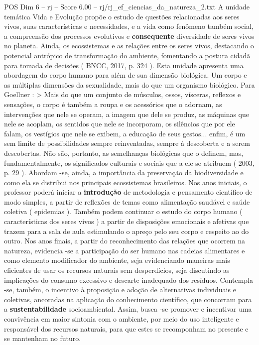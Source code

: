 \begin{textsample}{POS Dim 6 – rj – Score 6.00 – rj/rj\_ef\_ciencias\_da\_natureza\_2.txt}
A unidade temática Vida e Evolução propõe o estudo de questões relacionadas aos seres vivos, suas características e necessidades, e a vida como fenômeno também social, a compreensão dos processos evolutivos e \textbf{consequente} diversidade de seres vivos no planeta.
Ainda, os ecossistemas e as relações entre os seres vivos, destacando o potencial antrópico de transformação do ambiente, fomentando a postura cidadã para tomada de decisões ( BNCC, 2017, p. 324 ).
Esta unidade apresenta uma abordagem do corpo humano para além de sua dimensão biológica.
Um corpo e as múltiplas dimensões da sexualidade, mais do que um organismo biológico.
Para Goellner : > Mais do que um conjunto de músculos, ossos, vísceras, reflexos e sensações, o corpo é também a roupa e os acessórios que o adornam, as intervenções que nele se operam, a imagem que dele se produz, as máquinas que nele se acoplam, os sentidos que nele se incorporam, os silêncios que por ele falam, os vestígios que nele se exibem, a educação de seus gestos... enfim, é um sem limite de possibilidades sempre reinventadas, sempre à descoberta e a serem descobertas.
Não são, portanto, as semelhanças biológicas que o definem, mas, fundamentalmente, os significados culturais e sociais que a ele se atribuem ( 2003, p. 29 ).
Abordam -se, ainda, a importância da preservação da biodiversidade e como ela se distribui nos principais ecossistemas brasileiros.
Nos anos iniciais, o professor poderá iniciar a \textbf{introdução} de metodologia e pensamento científico de modo simples, a partir de reflexões de temas como alimentação saudável e saúde coletiva ( epidemias ).
Também podem continuar o estudo do corpo humano ( características dos seres vivos ) a partir de disposições emocionais e afetivas que trazem para a sala de aula estimulando o apreço pelo seu corpo e respeito ao do outro.
Nos anos finais, a partir do reconhecimento das relações que ocorrem na natureza, evidencia -se a participação do ser humano nas cadeias alimentares e como elemento modificador do ambiente, seja evidenciando maneiras mais eficientes de usar os recursos naturais sem desperdícios, seja discutindo as implicações do consumo excessivo e descarte inadequado dos resíduos.
Contempla -se, também, o incentivo à proposição e adoção de alternativas individuais e coletivas, ancoradas na aplicação do conhecimento científico, que concorram para a \textbf{sustentabilidade} socioambiental.
Assim, busca -se promover e incentivar uma convivência em maior sintonia com o ambiente, por meio do uso inteligente e responsável dos recursos naturais, para que estes se recomponham no presente e se mantenham no futuro.

\end{textsample}
